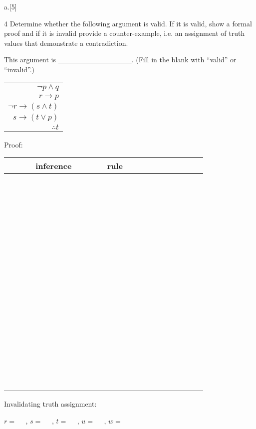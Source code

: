 \begin{question}{a.}[5]
\item[4]
Determine whether the following argument is valid. If it is valid, show a formal proof and if it is invalid provide a counter-example, i.e. an assignment of truth values that demonstrate a contradiction.


This argument is \underline{~~~~~~~~~~~~~~~~~~~~~}. (Fill in the blank with ``valid'' or ``invalid''.)
\vspace{0.2in}

\hspace{0.4in}\begin{tabular}{r}

$\lnot p \land q$\\
$r \rightarrow p$\\
$\lnot r \rightarrow (s \land t)$\\
$s \rightarrow (t \lor p)$\\
\hline
$\therefore  t  $\\
\end{tabular}
\vspace{0.2in}

Proof:

\hspace{0.4in}\begin{tabular}{r|l}
~~~~~~inference~~~~~~ & rule \\
\hline
 & ~~~~~~~~~~~~~~~~~~~~~~~\\
\hline
 & ~~~~~~~~~~~~~~~~~~~~~~~\\
\hline
 & ~~~~~~~~~~~~~~~~~~~~~~~\\
\hline
 & ~~~~~~~~~~~~~~~~~~~~~~~\\
\hline
 & ~~~~~~~~~~~~~~~~~~~~~~~\\
\hline
 & ~~~~~~~~~~~~~~~~~~~~~~~\\
\hline
 & ~~~~~~~~~~~~~~~~~~~~~~~\\
\hline
 & ~~~~~~~~~~~~~~~~~~~~~~~\\
\hline
 & ~~~~~~~~~~~~~~~~~~~~~~~\\
\hline
 & ~~~~~~~~~~~~~~~~~~~~~~~\\
\hline
 & ~~~~~~~~~~~~~~~~~~~~~~~\\
\hline
 & ~~~~~~~~~~~~~~~~~~~~~~~\\
\hline
 & ~~~~~~~~~~~~~~~~~~~~~~~\\
\hline
 & ~~~~~~~~~~~~~~~~~~~~~~~\\
\hline
 & ~~~~~~~~~~~~~~~~~~~~~~~\\
\hline
\end{tabular}
\large
\vspace{0.2in}

Invalidating truth assignment:\bigskip

$r=~~~~~~$, $s=~~~~~~$, $t=~~~~~~$, $u=~~~~~~$, $w=~~~~~~$


\end{question}
\newpage
